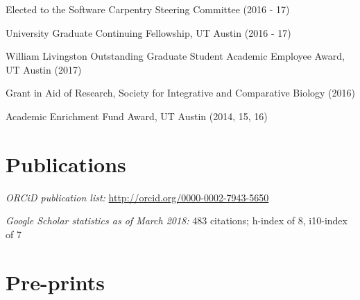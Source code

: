 \documentclass[margin,line]{CV}
\begin{document}
\begin{resume}
\begin{description}[leftmargin=0pt]  
\setlength{\itemsep}{1pt} 
\item[] Elected to the Software Carpentry Steering Committee (2016 - 17)
\item[] University Graduate Continuing Fellowship, UT Austin (2016 - 17)
\item[] William Livingston Outstanding Graduate Student Academic Employee Award, UT Austin (2017)
\item[] Grant in Aid of Research,  Society for Integrative and Comparative Biology (2016)
\item[] Academic Enrichment Fund Award, UT Austin (2014, 15, 16)
\end{description}




\section{\mysidestyle Publications}
    
\begin{description}[leftmargin=0pt]  
\setlength{\itemsep}{2pt} 
\item[] {\em ORCiD publication list:} \url{http://orcid.org/0000-0002-7943-5650}
\item[] {\em Google Scholar statistics as of March 2018:} 483 citations; h-index of 8, i10-index of 7
\end{description}

\section{\mysidestyle Pre-prints}


\end{resume}
\end{document}
